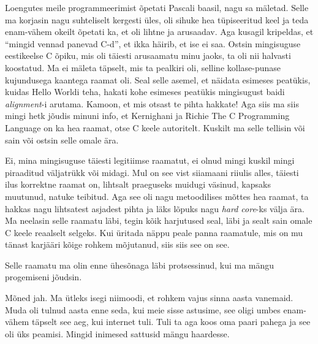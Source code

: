 Loengutes meile programmeerimist õpetati Pascali baasil, nagu sa mäletad. Selle ma korjasin nagu suhteliselt kergesti üles, oli sihuke hea tüpiseeritud keel ja teda enam-vähem okeilt õpetati ka, et oli lihtne ja arusaadav. Aga kusagil kripeldas, et \enquote{mingid vennad panevad C-d}, et ikka häirib, et ise ei saa. Ostsin mingisuguse eestikeelse C õpiku, mis oli täiesti arusaamatu minu jaoks, ta oli nii halvasti koostatud. Ma ei mäleta täpselt, mis ta pealkiri oli, selline kollase-punase kujundusega  kaantega raamat oli. Seal selle asemel, et näidata esimeses peatükis, kuidas Hello Worldi teha, hakati kohe esimeses peatükis mingisugust baidi \emph{alignment}-i  arutama.  Kamoon, et mis otsast te pihta hakkate! Aga siis ma siis mingi hetk jõudis minuni info, et Kernighani ja Richie The C Programming Language on ka hea raamat, otse C keele autoritelt. Kuskilt ma selle tellisin või sain või ostsin selle omale ära. 


Ei, mina mingisuguse täiesti legitiimse raamatut, ei olnud mingi kuskil mingi piraaditud väljatrükk või midagi. Mul on see vist siiamaani riiulis alles, täiesti ilus korrektne raamat on, lihtsalt praeguseks  muidugi väsinud, kapsaks muutunud, natuke teibitud. Aga see oli nagu metoodilises mõttes hea raamat, ta hakkas nagu lihtsatest asjadest pihta ja läks lõpuks nagu \emph{hard core}-ks välja ära. Ma neelasin selle raamatu läbi, tegin kõik harjutused seal, läbi ja sealt sain omale C keele reaalselt selgeks. Kui üritada näppu peale panna raamatule, mis on mu tänast karjääri kõige rohkem mõjutanud, siis siis see on see. 

Selle raamatu ma olin enne ühesõnaga läbi protsessinud, kui ma mängu progemiseni jõudsin.


Mõned jah. Ma ütleks isegi niimoodi, et rohkem vajus sinna aasta vanemaid. Muda oli  tulnud aasta enne seda, kui meie sisse astusime,  see oligi umbes enam-vähem täpselt see aeg, kui internet tuli. Tuli ta  aga koos oma paari pahega ja see oli üks peamisi. Mingid inimesed sattusid mängu haardesse.

